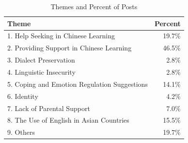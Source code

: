 \documentclass[11pt]{article}
\begin{document}
\begin{table}[ht]
\centering
\caption{Themes and Percent of Posts}
\vspace{0.35em}
\begin{tabular}{p{} r}
\toprule
Theme & Percent \\
\midrule
1. Help Seeking in Chinese Learning & 19.7\% \\
2. Providing Support in Chinese Learning & 46.5\% \\
3. Dialect Preservation & 2.8\% \\
4. Linguistic Insecurity & 2.8\% \\
5. Coping and Emotion Regulation Suggestions & 14.1\% \\
6. Identity & 4.2\% \\
7. Lack of Parental Support & 7.0\% \\
8. The Use of English in Asian Countries & 15.5\% \\
9. Others & 19.7\% \\
\bottomrule
\end{tabular}
\end{table}
\end{document}

